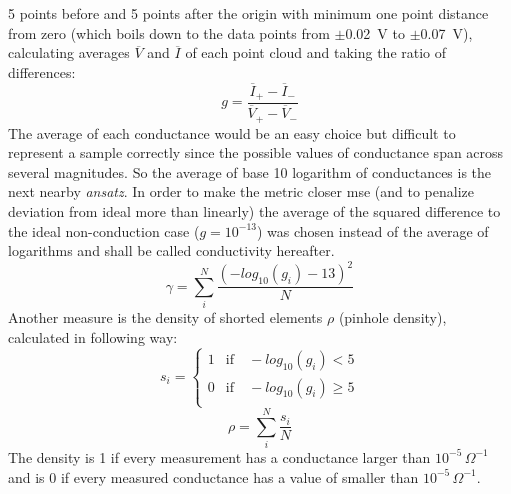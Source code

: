 5 points before and 5 points after the origin with minimum one point distance from zero (which boils
down to the data points from $\pm$\SI{0.02}{\volt} to $\pm$\SI{0.07}{\volt}), 
calculating averages $\overline{V}$ and $\overline{I}$ of each point cloud and taking the ratio of differences:
\begin{equation}
    g = \frac{\overline{I}_{+} - \overline{I}_-}{\overline{V}_{+} - \overline{V}_-}
\end{equation}
%
The average of each conductance would be an easy choice but difficult to represent a 
sample correctly since the possible values of conductance span across several magnitudes.
So the average of base 10 logarithm of conductances is the next nearby \textit{ansatz}.
%
In order to make the metric closer 
\gls{mse} (and to penalize deviation from ideal more than linearly) the average of the squared difference 
to the ideal non-conduction case ($g=10^{-13}$) was chosen instead of the average of logarithms and shall be called conductivity hereafter. %
%
\begin{equation}
    \gamma = \sum_i^N \frac{ (-log_{10}(g_i) - 13)^2}{N}
	\label{eq:gamma}
\end{equation}
Another measure is the density of shorted elements $\rho$ (pinhole density), calculated in following way:
\begin{equation}
	s_i = \begin{cases}
        1 &\text{if} \quad -log_{10}(g_i) < 5 \\
        0 &\text{if} \quad -log_{10}(g_i) \geq 5 \\
	\end{cases}
\end{equation}
\begin{equation}
	\rho = \sum_i^N \frac{s_i}{N}
	\label{eq:rho}
\end{equation}
The density is 1 if every measurement has a conductance larger than $10^{-5} \, \Omega^{-1}$ and is 0 if every measured conductance has a value of smaller than $10^{-5} \, \Omega^{-1}$.
%


